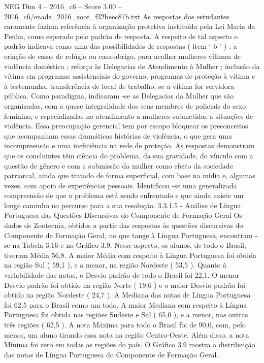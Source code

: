 \begin{textsample}{NEG Dim 4 – 2016\_c6 – Score 3.00 – 2016\_c6/enade\_2016\_zoot\_f32beec87b.txt}
As respostas dos estudantes raramente faziam referência à organização protetiva instituída pela Lei Maria da Penha, como esperado pelo padrão de resposta.
A respeito de tal aspecto o padrão indicava como uma das possibilidades de respostas ( item ‘ b ’ ) : a criação de casas de refúgio ou casa-abrigo, para acolher mulheres vítimas de violência doméstica ; reforço às Delegacias de Atendimento à Mulher ; inclusão da vítima em programas assistenciais do governo, programas de proteção à vítima e à testemunha, transferência de local de trabalho, se a vítima for servidora pública.
Como paradigma, indicaram -se as Delegacias da Mulher que são organizadas, com a quase integralidade dos seus membros de policiais do sexo feminino, e especializadas no atendimento a mulheres submetidas a situações de violência.
Essa preocupação gerencial tem por escopo bloquear os preconceitos que acompanham essas dramáticas histórias de violência, o que gera uma incompreensão e uma ineficiência na rede de proteção.
As respostas demonstram que os concluintes têm ciência do problema, da sua gravidade, do vínculo com a questão de gênero e com a submissão da mulher como efeito da sociedade patriarcal, ainda que tratado de forma superficial, com base na mídia e, algumas vezes, com apoio de experiências pessoais.
Identificou -se uma generalizada compreensão de que o problema está sendo enfrentado e que ainda existe um longo caminho no percurso para a sua resolução. 3.3.1.5 - Análise de Língua Portuguesa das Questões Discursivas do Componente de Formação Geral Os dados de Zootecnia, obtidos a partir das respostas às questões discursivas do Componente de Formação Geral, no que tange à Língua Portuguesa, encontram -se na Tabela 3.16 e no Gráfico 3.9.
Nesse aspecto, os alunos, de todo o Brasil, tiveram Média 56,8.
A maior Média com respeito à Língua Portuguesa foi obtida na região Sul ( 59,1 ), e a menor, na região Nordeste ( 53,5 ).
Quanto à variabilidade das notas, o Desvio padrão de todo o Brasil foi 22,1.
O menor Desvio padrão foi obtido na região Norte ( 19,6 ) e o maior Desvio padrão foi obtido na região Nordeste ( 24,7 ).
A Mediana das notas de Língua Portuguesa foi 62,5 para o Brasil como um todo.
A maior Mediana com respeito à Língua Portuguesa foi obtida nas regiões Sudeste e Sul ( 65,0 ), e a menor, nas outras três regiões ( 62,5 ).
A nota Máxima para todo o Brasil foi de 90,0, com, pelo menos, um aluno tirando essa nota na região Centro-Oeste.
Além disso, a nota Mínima foi zero em todas as regiões do país.
O Gráfico 3.9 mostra a distribuição das notas de Língua Portuguesa do Componente de Formação Geral.

\end{textsample}
